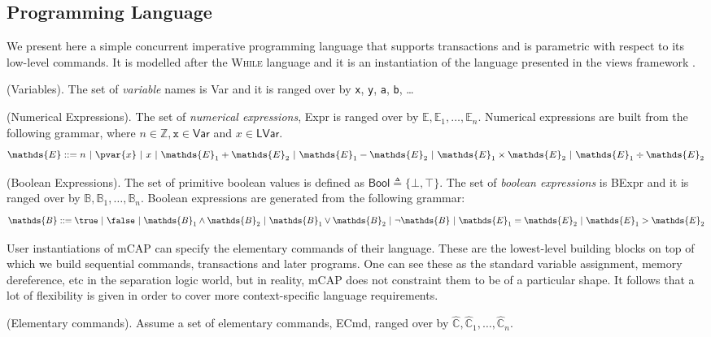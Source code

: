 \subsection{Programming Language}
\label{language}

We present here a simple concurrent imperative programming language that supports transactions and is parametric with respect to its low-level commands. It is modelled after the \textsc{While} language and it is an instantiation of the language presented in the views framework \cite{views}.

\begin{defn}
	(Variables).
	The set of \emph{variable} names is \textsf{Var} and it is ranged over by \texttt{x}, \texttt{y}, \texttt{a}, \texttt{b}, \ldots
\end{defn}

\begin{defn}
	(Numerical Expressions).
	The set of \emph{numerical expressions}, \textsf{Expr} is ranged over by $\mathds{E}, \mathds{E}_1, \ldots, \mathds{E}_n$. Numerical expressions are built from the following grammar, where $n \in \mathds{Z}, \mathtt{x} \in \mathsf{Var}$ and $x \in \mathsf{LVar}$.
	\[
		\mathds{E} ::=
			n\
			|\ \pvar{x}\
			|\ x\
			|\ \mathds{E}_1 + \mathds{E}_2\
			|\ \mathds{E}_1 - \mathds{E}_2\
			|\ \mathds{E}_1 \times \mathds{E}_2\
			|\ \mathds{E}_1 \div \mathds{E}_2
	\]
\end{defn}

\begin{defn}
	(Boolean Expressions).
	The set of primitive boolean values is defined as $\mathsf{Bool} \triangleq \{ \bot, \top \}$. The set of \emph{boolean expressions} is \textsf{BExpr} and it is ranged over by $\mathds{B}, \mathds{B}_1, \ldots, \mathds{B}_n$. Boolean expressions are generated from the following grammar:
	\[
		\mathds{B} ::=
			\true\
			|\ \false\
			|\ \mathds{B}_1 \land \mathds{B}_2\
			|\ \mathds{B}_1 \lor \mathds{B}_2\
			|\ \lnot \mathds{B}\
			|\ \mathds{E}_1 = \mathds{E}_2\
			|\ \mathds{E}_1 > \mathds{E}_2
	\]
\end{defn}

User instantiations of mCAP can specify the elementary commands of their language. These are the lowest-level building blocks on top of which we build sequential commands, transactions and later programs. One can see these as the standard variable assignment, memory dereference, etc in the separation logic world, but in reality, mCAP does not constraint them to be of a particular shape. It follows that a lot of flexibility is given in order to cover more context-specific language requirements.
\begin{param}
	\label{param:ecmd}
	(Elementary commands).
	Assume a set of elementary commands, \textsf{ECmd}, ranged over by $\hat{\mathds{C}}, \hat{\mathds{C}}_1, \ldots, \hat{\mathds{C}}_n$.
\end{param}

